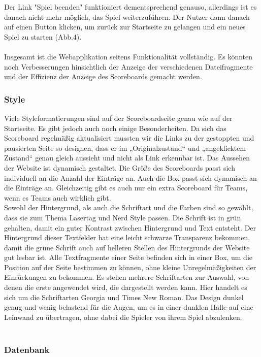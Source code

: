 Der Link "Spiel beenden" funktioniert dementsprechend genauso, allerdings ist es danach nicht mehr möglich, das Spiel weiterzuführen. Der Nutzer dann danach auf einen Button klicken, um zurück zur Startseite zu gelangen und ein neues Spiel zu starten (Abb.4).\\\\
Insgesamt ist die Webapplikation seitens Funktionalität vollständig. Es könnten noch Verbesserungen hinsichtlich der Anzeige der verschiedenen Dateifragmente und der Effizienz der Anzeige des Scoreboards gemacht werden.


\subsubsection{Style}

Viele Styleformatierungen sind auf der Scoreboardseite genau wie auf der Startseite. Es gibt jedoch auch noch einige Besonderheiten. Da sich das Scoreboard regelmäßig aktualisiert mussten wir die Links zu der gestoppten und pausierten Seite so designen, dass er im „Originalzustand“ und „angeklicktem Zustand“ genau gleich aussieht und nicht als Link erkennbar ist.
Das Aussehen der Website ist  dynamisch gestaltet. Die Größe des Scoreboards passt sich individuell an die Anzahl der Einträge an. Auch die Box passt sich dynamisch an die Einträge an. Gleichzeitig gibt es auch nur ein extra Scoreboard für Teams, wenn es Teams auch wirklich gibt.\\ Sowohl der Hintergrund, als auch die Schriftart und die Farben sind so gewählt, dass sie zum Thema Lasertag und Nerd Style passen. 
Die Schrift ist in grün gehalten, damit ein guter Kontrast zwischen Hintergrund und Text entsteht. Der Hintergrund dieser Textfelder hat eine leicht schwarze Transparenz bekommen, damit die grüne Schrift auch auf helleren Stellen des Hintergrunds der Website gut lesbar ist. Alle Textfragmente einer Seite befinden sich in einer Box, um die Position auf der Seite bestimmen zu können, ohne kleine Unregelmäßigkeiten der Einrückungen zu bekommen. Es stehen mehrere Schriftarten zur Auswahl, von denen die erste angewendet wird, die dargestellt werden kann. Hier handelt es sich um die Schriftarten Georgia und Times New Roman. Das Design dunkel genug und wenig belastend für die Augen, um es in einer dunklen Halle auf eine Leinwand zu übertragen, ohne dabei die Spieler von ihrem Spiel abzulenken. \\\\

\subsubsection{Datenbank}

